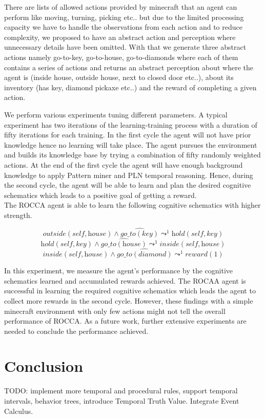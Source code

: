 \documentclass[runningheads]{llncs}
\newcommand{\MAnd}{\wedge}
\newcommand{\MPredImpl}[1]{\leadsto^{#1}}
\newcommand{\MDo}[1]{\widehat{#1}}
\begin{document}
There are lists of allowed actions provided by minecraft that an agent can perform like moving, turning, picking etc.. but due to the limited processing capacity we have to handle the observations from each action and to reduce complexity, we proposed to have an abstract action and perception where unnecessary details have been omitted. With that we generate three abstract actions namely go-to-key, go-to-house, go-to-diamonds where each of them contains a series of actions and returns an abstract perception about where the agent is (inside house, outside house, next to closed door etc..), about its inventory (has key, diamond pickaxe etc..) and the reward of completing a given action. \par
We perform various experiments tuning different parameters. A typical experiment has two iterations of the learning-training process with a duration of fifty iterations for each training. In the first cycle the agent will not have prior knowledge hence no learning will take place. The agent pursues the environment and builds its knowledge base by trying a combination of fifty randomly weighted actions. At the end of the first cycle the agent will have enough background knowledge to apply Pattern miner and PLN temporal reasoning. Hence, during the second cycle, the agent will be able to learn and plan the desired cognitive schematics which leads to a positive goal of getting a reward.\\
The ROCCA agent is able to learn the following cognitive schematics with higher strength.

$$\textit{outside}(\textit{self}, \textit{house}) \MAnd \MDo{\textit{go\_to}(\textit{key})} \MPredImpl{1} \textit{hold}(\textit{self}, \textit{key})$$
$$\textit{hold}(\textit{self}, \textit{key}) \MAnd \MDo{\textit{go\_to}(\textit{house})} \MPredImpl{1} \textit{inside}(\textit{self}, \textit{house})$$
$$\textit{inside}(\textit{self}, \textit{house}) \MAnd \MDo{\textit{go\_to}(\textit{diamond})} \MPredImpl{1} \textit{reward}(1)$$

In this experiment, we measure the agent's performance by the cognitive schematics learned and accumulated rewards achieved. The ROCAA agent is successful in learning the required cognitive schematics which leads the agent to collect more rewards in the second cycle. However, these findings with a simple minecraft environment with only few actions might not tell the overall performance of ROCCA. As a future work, further extensive experiments are needed to conclude the performance achieved.

\section{Conclusion}

TODO: implement more temporal and procedural rules, support temporal
intervals, behavior trees, introduce Temporal Truth Value.  Integrate
Event Calculus.

%
%
 
\end{document}

